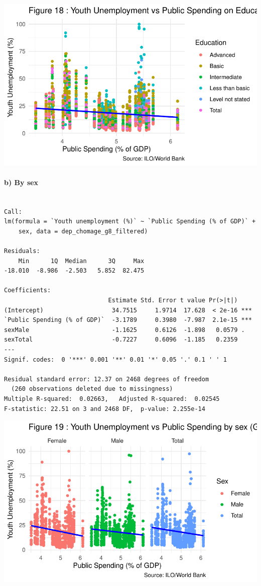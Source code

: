 \documentclass[
  letterpaper,
  DIV=11,
  numbers=noendperiod]{scrartcl}
\let\oldparagraph\paragraph
\renewcommand{\paragraph}[1]{\oldparagraph{#1}\mbox{}}
\begin{document}
\includegraphics{Projet-BM_files/figure-pdf/unnamed-chunk-45-1.pdf}

\hypertarget{b-by-sex}{%
\paragraph{b) By sex}\label{b-by-sex}}

\begin{verbatim}

Call:
lm(formula = `Youth unemployment (%)` ~ `Public Spending (% of GDP)` + 
    sex, data = dep_chomage_g8_filtered)

Residuals:
    Min      1Q  Median      3Q     Max 
-18.010  -8.986  -2.503   5.852  82.475 

Coefficients:
                             Estimate Std. Error t value Pr(>|t|)    
(Intercept)                   34.7515     1.9714  17.628  < 2e-16 ***
`Public Spending (% of GDP)`  -3.1789     0.3980  -7.987  2.1e-15 ***
sexMale                       -1.1625     0.6126  -1.898   0.0579 .  
sexTotal                      -0.7227     0.6096  -1.185   0.2359    
---
Signif. codes:  0 '***' 0.001 '**' 0.01 '*' 0.05 '.' 0.1 ' ' 1

Residual standard error: 12.37 on 2468 degrees of freedom
  (260 observations deleted due to missingness)
Multiple R-squared:  0.02663,   Adjusted R-squared:  0.02545 
F-statistic: 22.51 on 3 and 2468 DF,  p-value: 2.255e-14
\end{verbatim}

\includegraphics{Projet-BM_files/figure-pdf/unnamed-chunk-46-1.pdf}
\end{document}
